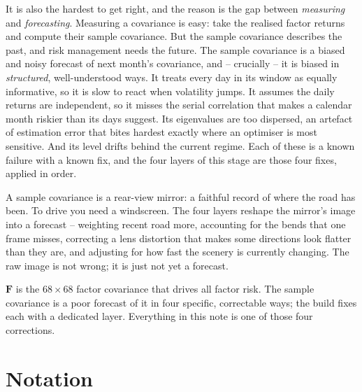 \documentclass[11pt]{article}
\theoremstyle{definition}
\theoremstyle{plain}
\theoremstyle{remark}
\newcommand{\Fmat}{\mathbf{F}}
\begin{document}
It is also the hardest to get right, and the reason is the gap between \emph{measuring} and \emph{forecasting}. Measuring a covariance is easy: take the realised factor returns and compute their sample covariance. But the sample covariance describes the past, and risk management needs the future. The sample covariance is a biased and noisy forecast of next month's covariance, and -- crucially -- it is biased in \emph{structured}, well-understood ways. It treats every day in its window as equally informative, so it is slow to react when volatility jumps. It assumes the daily returns are independent, so it misses the serial correlation that makes a calendar month riskier than its days suggest. Its eigenvalues are too dispersed, an artefact of estimation error that bites hardest exactly where an optimiser is most sensitive. And its level drifts behind the current regime. Each of these is a known failure with a known fix, and the four layers of this stage are those four fixes, applied in order.

\begin{intuition}
A sample covariance is a rear-view mirror: a faithful record of where the road has been. To drive you need a windscreen. The four layers reshape the mirror's image into a forecast -- weighting recent road more, accounting for the bends that one frame misses, correcting a lens distortion that makes some directions look flatter than they are, and adjusting for how fast the scenery is currently changing. The raw image is not wrong; it is just not yet a forecast.
\end{intuition}

\begin{keyresult}
$\Fmat$ is the $68\times68$ factor covariance that drives all factor risk. The sample covariance is a poor forecast of it in four specific, correctable ways; the build fixes each with a dedicated layer. Everything in this note is one of those four corrections.
\end{keyresult}

\section*{Notation}
\end{document}
